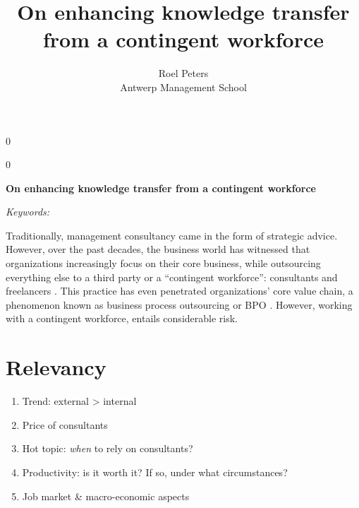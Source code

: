 \documentclass[12pt]{article}
\newcommand{\blind}{0}
\providecommand{\tightlist}{%
  \setlength{\itemsep}{0pt}\setlength{\parskip}{0pt}}
\begin{document}
\def\spacingset#1{\renewcommand{\baselinestretch}%
{#1}\small\normalsize} \spacingset{1}



\blind
{
  \title{\bf On enhancing knowledge transfer from a contingent
workforce}

  \author{
        Roel Peters \\
    Antwerp Management School\\
      }
  \maketitle
} \fi

\blind
{
  \bigskip
  \bigskip
  \bigskip
  \begin{center}
    {\LARGE\bf On enhancing knowledge transfer from a contingent
workforce}
  \end{center}
  \medskip
} \fi

\bigskip
\begin{abstract}

\end{abstract}

\noindent%
{\it Keywords:} 
\vfill

\newpage
\spacingset{1.45} %

Traditionally, management consultancy came in the form of strategic
advice. However, over the past decades, the business world has witnessed
that organizations increasingly focus on their core business, while
outsourcing everything else to a third party or a ``contingent
workforce'': consultants and freelancers \citep{msp2022}. This practice
has even penetrated organizations' core value chain, a phenomenon known
as business process outsourcing or BPO \citep{shi1}. However, working
with a contingent workforce, entails considerable risk.

\hypertarget{relevancy}{%
\section{Relevancy}\label{relevancy}}

\begin{enumerate}
\def\labelenumi{\arabic{enumi}.}
\tightlist
\item
  Trend: external \textgreater{} internal
\item
  Price of consultants
\item
  Hot topic: \emph{when} to rely on consultants?
\item
  Productivity: is it worth it? If so, under what circumstances?
\item
  Job market \& macro-economic aspects
\end{enumerate}
\end{document}
